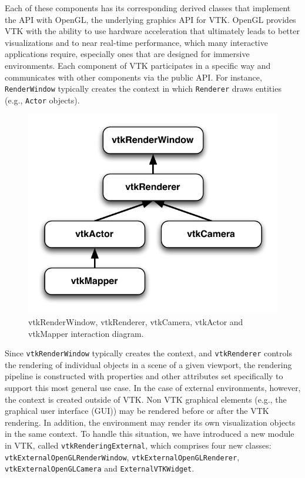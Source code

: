 Each of these components has its corresponding derived classes that implement the API with OpenGL, the underlying graphics API for VTK.
OpenGL provides VTK with the ability to use hardware acceleration that ultimately leads to better visualizations and to near real-time performance, which many interactive applications require, especially ones that are designed for immersive environments.
Each component of VTK participates in a specific way and communicates with other components via the public API.
For instance, \texttt{RenderWindow} typically creates the context in which
\texttt{Renderer} draws entities (e.g., \texttt{Actor} objects).

\begin{figure}[h!]
  \centering
  \includegraphics[width=0.5\linewidth]{images/vtkRenderPipeline.pdf}
  \caption{vtkRenderWindow, vtkRenderer, vtkCamera, vtkActor and vtkMapper interaction diagram.}
  \label{fig:vtkRenderPipeline}
\end{figure}

Since \texttt{vtkRenderWindow} typically creates the context, and \texttt{vtkRenderer} controls the rendering of individual objects in a scene of a given viewport, the rendering pipeline is constructed with properties and other attributes set specifically to support this most general use case.
In the case of external environments, however, the context is created outside of VTK. Non VTK graphical elements (e.g., the graphical user interface (GUI)) may be rendered before or after the VTK rendering.
In addition, the environment may render its own visualization objects in the same context.
To handle this situation, we have introduced a new module in VTK, called \texttt{vtkRenderingExternal}, which comprises four new classes: \texttt{vtkExternalOpenGLRenderWindow}, \texttt{vtkExternalOpenGLRenderer}, \texttt{vtkExternalOpenGLCamera} and \texttt{ExternalVTKWidget}. 

